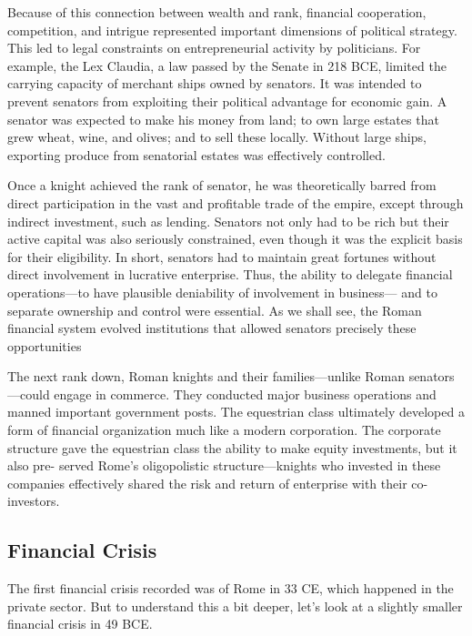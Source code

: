 \documentclass{article}
\begin{document}
    Because of this connection between wealth and rank, financial cooperation, competition, and intrigue represented important dimensions of political strategy. This led to legal constraints on entrepreneurial activity by politicians. For example, the Lex Claudia, a law passed by the Senate in 218 BCE, limited the carrying capacity of merchant ships owned by senators. It was intended to prevent senators from exploiting their political advantage for economic gain. A senator was expected to make his money from land; to own large estates that grew wheat, wine, and olives; and to sell these locally. Without large ships, exporting produce from senatorial estates was effectively controlled.

    Once a knight achieved the rank of senator, he was theoretically barred from direct participation in the vast and profitable trade of the empire, except through indirect investment, such as lending. Senators not only had to be rich but their active capital was also seriously constrained, even though it was the explicit basis for their eligibility. In short, senators had to maintain great fortunes without direct involvement in lucrative enterprise. Thus, the ability to delegate financial operations—to have plausible deniability of involvement in business— and to separate ownership and control were essential. As we shall see, the Roman financial system evolved institutions that allowed senators precisely these opportunities

    The next rank down, Roman knights and their families—unlike Roman senators—could engage in commerce. They conducted major business operations and manned important government posts. The equestrian class ultimately developed a form of financial organization much like a modern corporation. The corporate structure gave the equestrian class the ability to make equity investments, but it also pre- served Rome’s oligopolistic structure—knights who invested in these companies effectively shared the risk and return of enterprise with their co-investors.

  \subsection{Financial Crisis}

    The first financial crisis recorded was of Rome in 33 CE, which happened in the private sector. But to understand this a bit deeper, let's look at a slightly smaller financial crisis in 49 BCE. 
\end{document}
